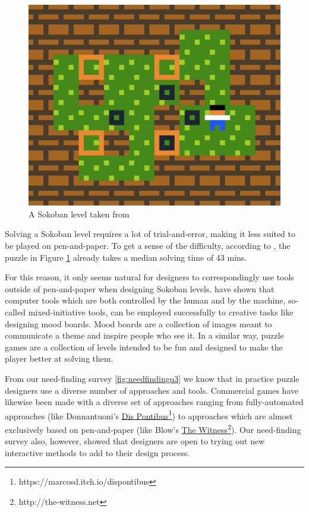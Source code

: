\begin{figure}[h]
    \centering
    \setlength{\tabcolsep}{0.0130\linewidth}
    \includegraphics[width=0.487\linewidth]{figures/45minslevel.png}
    
    \caption[43 Minute Sokoban level]{A Sokoban level taken from \cite{Pelanek2011} %
      \label{fig:43minsfig}}
\end{figure}

Solving a Sokoban level requires a lot of trial-and-error, making it less suited to be played on pen-and-paper. To get a sense of the difficulty, according to \cite{Pelanek2011}, the puzzle in Figure \ref{fig:43minsfig} already takes a median solving time of 43 mins.

For this reason, it only seems natural for designers to correspondingly use tools outside of pen-and-paper when designing Sokoban levels. \cite{Koch} have shown that computer tools which are both controlled by the human and by the machine, so-called mixed-initiative tools, can be employed successfully to creative tasks like designing mood boards. Mood boards are a collection of images meant to communicate a theme and inspire people who see it. In a similar way, puzzle games are a collection of levels intended to be fun and designed to make the player better at solving them.
 
From our need-finding survey \ref{fig:needfindingq3} we know that in practice puzzle designers use a diverse number of approaches and tools. Commercial games have likewise been made with a diverse set of approaches ranging from fully-automated approaches (like Donnantuoni's \href{https://marcosd.itch.io/dispontibus}{Dis Pontibus}\footnote{https://marcosd.itch.io/dispontibus}) to approaches which are almost exclusively based on pen-and-paper (like Blow's \href{http://the-witness.net}{The Witness}\footnote{http://the-witness.net}). Our need-finding survey also, however, showed that designers are open to trying out new interactive methods to add to their design process.

